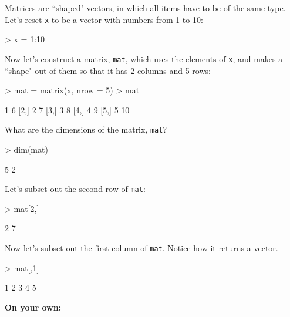 \documentclass[answers]{exam}
\begin{document}
Matrices are ``shaped" vectors, in which all items have to be of the same type. Let's reset \texttt{x} to be a vector with numbers from 1 to 10:
\begin{Schunk}
\begin{Sinput}
> x = 1:10
\end{Sinput}
\end{Schunk}
\noindent Now let's construct a matrix, \texttt{mat}, which uses the elements of \texttt{x}, and makes a ``shape" out of them so that it has 2 columns and 5 rows:
\begin{Schunk}
\begin{Sinput}
> mat = matrix(x, nrow = 5) 
> mat
\end{Sinput}
\begin{Soutput}
     [,1] [,2]
[1,]    1    6
[2,]    2    7
[3,]    3    8
[4,]    4    9
[5,]    5   10
\end{Soutput}
\end{Schunk}
\noindent What are the dimensions of the matrix, \texttt{mat}?
\begin{Schunk}
\begin{Sinput}
> dim(mat)
\end{Sinput}
\begin{Soutput}
[1] 5 2
\end{Soutput}
\end{Schunk}

\noindent Let's subset out the second row of \texttt{mat}:
\begin{Schunk}
\begin{Sinput}
> mat[2,] 
\end{Sinput}
\begin{Soutput}
[1] 2 7
\end{Soutput}
\end{Schunk}

\noindent Now let's subset out the first column of \texttt{mat}. Notice how it returns a vector.
\begin{Schunk}
\begin{Sinput}
> mat[,1] 
\end{Sinput}
\begin{Soutput}
[1] 1 2 3 4 5
\end{Soutput}
\end{Schunk}

\noindent\textbf{On your own:}
\end{document}
